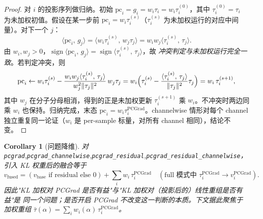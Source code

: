\documentclass[11pt,a4paper]{article}
\newcommand{\PC}{\mathrm{PCGrad}}
\newcommand{\vb}{v_{\mathrm{base}}}
\newcommand{\inner}[2]{\langle #1,\, #2\rangle}
\newcommand{\norm}[1]{\lVert #1\rVert}
\DeclareMathOperator{\sign}{sign}
\theoremstyle{plain}
\newtheorem{corollary}{Corollary}
\theoremstyle{definition}
\begin{document}
\begin{proof}
对 $i$ 的投影序列做归纳。初始 $\text{pc}_i=g_i=w_i\tau_i=w_i\tau_i^{(0)}$，其中 $\tau_i^{(0)}=\tau_i$ 为未加权初值。假设在某一步前 $\text{pc}_i=w_i\tau_i^{(s)}$（$\tau_i^{(s)}$ 为未加权运行的对应中间量）。对下一个 $j$：
\[
\inner{\text{pc}_i}{g_j}=\inner{w_i\tau_i^{(s)}}{w_j\tau_j}=w_iw_j\inner{\tau_i^{(s)}}{\tau_j}.
\]
由 $w_i,w_j>0$，$\sign\inner{\text{pc}_i}{g_j}=\sign\inner{\tau_i^{(s)}}{\tau_j}$，故 \emph{冲突判定与未加权运行完全一致}。若判定冲突，则
\[
\text{pc}_i \leftarrow w_i\tau_i^{(s)} - \frac{w_iw_j\inner{\tau_i^{(s)}}{\tau_j}}{w_j^2\norm{\tau_j}^2}\,w_j\tau_j
= w_i\Bigl(\tau_i^{(s)} - \frac{\inner{\tau_i^{(s)}}{\tau_j}}{\norm{\tau_j}^2}\tau_j\Bigr)=w_i\,\tau_i^{(s+1)},
\]
其中 $w_j$ 在分子分母相消，得到的正是未加权更新 $\tau_i^{(s+1)}$ 乘 $w_i$。不冲突时两边同乘 $w_i$ 也保持。归纳完成，末态 $\text{pc}_i=w_i\tau_i^{\PC}$。channelwise 情形对每个 channel 独立重复同一论证（$w_i$ 是 per-sample 标量，对所有 channel 相同），结论不变。
\end{proof}

\begin{corollary}[问题降维]
\label{cor:reduce}
对 \texttt{pcgrad},\texttt{pcgrad\_channelwise},\texttt{pcgrad\_residual},\texttt{pcgrad\_residual\_channelwise}，引入 KL 权重后的融合等于
\begin{equation}
v_{\mathrm{fused}} = (\vb \text{ if residual else } 0) + \sum_i w_i\,\tau_i^{\PC}\quad(\text{full 模式中 } \tau_i^{\PC}\to v_i^{\PC}).
\end{equation}
因此"KL 加权对 PCGrad 是否有益"与"KL 加权对（投影后的）线性重组是否有益"是 \emph{同一个问题}；是否开启 PCGrad 不改变这一判断的本质。下文据此聚焦于加权重组 $\bar\tau(\alpha)=\sum_i w_i(\alpha)\,\tau_i^{\PC}$。
\end{corollary}
\end{document}
